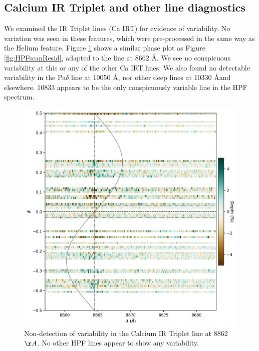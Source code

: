 \documentclass[twocolumn]{aastex631}
\begin{document}
\subsection{Calcium IR Triplet and other line diagnostics}
We examined the  IR Triplet lines (Ca IRT) for evidence of variability.  No variation was seen in these features, which were pre-processed in the same way as the Helium feature.  Figure \ref{fig:CaPhaseScan} shows a similar phase plot as Figure \ref{fig:HPFscanResid}, adapted to the line at 8662 \AA.  We see no conspicuous variability at this or any of the other Ca IRT lines.  We also found no detectable variability in the Pa$\delta$ line at 10050 \AA, nor other deep lines at 10330 \AA and elsewhere.   10833 appears to be the only conspicuously variable line in the HPF spectrum.

\begin{figure}
    \includegraphics[width=\linewidth]{figures/Ca8662_phase_2D_diagram_resid.png}
    \caption{Non-detection of variability in the Calcium IR Triplet line at 8862 $\AA$.  No other HPF lines appear to show any variability.}
    \label{fig:CaPhaseScan}
\end{figure}
\end{document}
